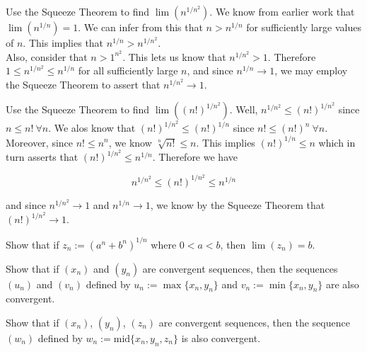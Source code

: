 \documentclass[paper=a4, fontsize=11pt]{scrartcl} %
\numberwithin{equation}{section} %
\numberwithin{figure}{section} %
\numberwithin{table}{section} %
\begin{document}
 Use the Squeeze Theorem to find $\lim(n^{1/n^2})$.
\pf We know from earlier work that $\lim(n^{1/n}) = 1$. We can infer from this that $n > n^{1/n}$ for sufficiently large values of $n$. This implies that $n^{1/n} > n^{1/n^2}$.\\

Also, consider that $n > 1^{n^2}$. This lets us know that $n^{1/n^2} > 1$. Therefore $1 \leq n^{1/n^2} \leq n^{1/n}$ for all sufficiently large $n$, and since $n^{1/n} \rightarrow 1$, we may employ the Squeeze Theorem to assert that $n^{1/n^2} \rightarrow 1$. \done

 Use the Squeeze Theorem to find $\lim((n!)^{1/n^2})$.
\pf Well, $n^{1/n^2} \leq (n!)^{1/n^2}$ since $n \leq n! ~ \forall n$. We alos know that $(n!)^{1/n^2} \leq (n!)^{1/n}$ since $n! \leq (n!)^n ~ \forall n$. Moreover, since $n! \leq n^n$, we know $\sqrt[n]{n!} \leq n$. This implies $(n!)^{1/n} \leq n$ which in turn asserts that $(n!)^{1/n^2} \leq n^{1/n}$. Therefore we have

\begin{equation*}
n^{1/n^2} \leq (n!)^{1/n^2} \leq n^{1/n}
\end{equation*}

and since $n^{1/n^2} \rightarrow 1$ and $n^{1/n} \rightarrow 1$, we know by the Squeeze Theorem that $ (n!)^{1/n^2} \rightarrow 1$. \done

 Show that if $z_n := (a^n + b^n)^{1/n}$ where $0 < a < b$, then $\lim(z_n) = b$.
\pf

 Show that if $(x_n)$ and $(y_n)$ are convergent sequences, then the sequences $(u_n)$ and $(v_n)$ defined by $u_n := \max\{x_n, y_n\}$ and $v_n := \min\{x_n, y_n\}$ are also convergent.
\pf

 Show that if $(x_n)$, $(y_n)$, $(z_n)$ are convergent sequences, then the sequence $(w_n)$ defined by $w_n := \text{mid}\{x_n, y_n, z_n\}$ is also convergent.
\pf
\end{document}
